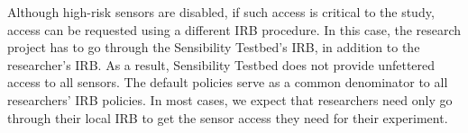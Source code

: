 Although high-risk sensors are disabled, if such access  is critical to the 
study, access can be requested using a different IRB procedure. 
In this case, the research project has to go through the Sensibility 
Testbed's IRB, in addition to the researcher's IRB. 
 
%
%
As a result, Sensibility Testbed does not
provide unfettered access to all sensors. 
The default policies serve as a common denominator to all 
researchers' IRB policies. In most cases, we expect
that researchers need only go through their local IRB to get
the sensor access they need for their experiment. 
